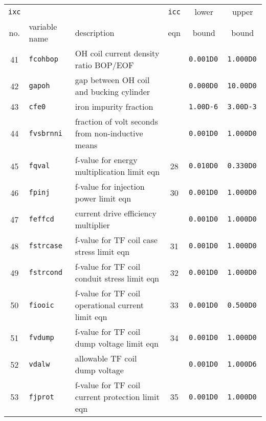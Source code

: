 \documentclass[11pt,a4paper]{report}
\begin{document}
\begin{table}[tbph]
\footnotesize
\begin{center}

\begin{tabular}{||c|l|l|c|c|c||} \hline
{\tt ixc} &           &                                                         & {\tt icc} & lower        & upper       \\
no. & variable name   & description                                             & eqn       & bound        & bound       \\ \hline
41  & \tt fcohbop     & OH coil current density ratio BOP/EOF                   &           & \tt 0.001D0  & \tt 1.000D0 \\
42  & \tt gapoh       & gap between OH coil and bucking cylinder                &           & \tt 0.000D0  & \tt 10.00D0 \\
43  & \tt cfe0        & iron impurity fraction                                  &           & \tt 1.00D-6  & \tt 3.00D-3 \\
44  & \tt fvsbrnni    & fraction of volt seconds from non-inductive means       &           & \tt 0.001D0  & \tt 1.000D0 \\
45  & \tt fqval       & f-value for energy multiplication limit eqn             & 28        & \tt 0.010D0  & \tt 0.330D0 \\
46  & \tt fpinj       & f-value for injection power limit eqn                   & 30        & \tt 0.001D0  & \tt 1.000D0 \\
47  & \tt feffcd      & current drive efficiency multiplier                     &           & \tt 0.001D0  & \tt 1.000D0 \\
48  & \tt fstrcase    & f-value for TF coil case stress limit eqn               & 31        & \tt 0.001D0  & \tt 1.000D0 \\
49  & \tt fstrcond    & f-value for TF coil conduit stress limit eqn            & 32        & \tt 0.001D0  & \tt 1.000D0 \\
50  & \tt fiooic      & f-value for TF coil operational current limit eqn       & 33        & \tt 0.001D0  & \tt 0.500D0 \\
51  & \tt fvdump      & f-value for TF coil dump voltage limit eqn              & 34        & \tt 0.001D0  & \tt 1.000D0 \\
52  & \tt vdalw       & allowable TF coil dump voltage                          &           & \tt 0.001D0  & \tt 1.000D6 \\
53  & \tt fjprot      & f-value for TF coil current protection limit eqn        & 35        & \tt 0.001D0  & \tt 1.000D0 \\

\end{tabular}
\end{center}
\end{table}
\end{document}

